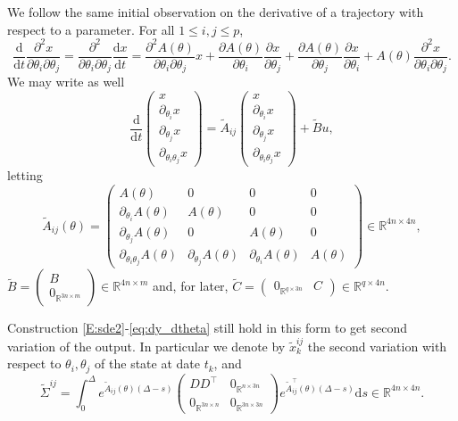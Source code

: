 \documentclass[twocolumn]{autart}
\theoremstyle{definition}
\theoremstyle{remark}
\newcommand{\R}{\mathbb{R}}
\newcommand{\diff}{\mathrm{d}}
\begin{document}
We follow the same initial observation on the derivative of a trajectory with respect to a parameter. For all $1\leq i,j\leq p$,
$$
\frac{\diff}{\diff t} \frac{\partial^2 x}{\partial \theta_i\partial \theta_j}
= 
\frac{\partial^2 }{\partial \theta_i\partial \theta_j} \frac{\diff x}{\diff t}
= 
\frac{\partial^2  A(\theta)}{\partial \theta_i\partial \theta_j}x +
\frac{\partial  A(\theta)}{\partial \theta_i}\frac{\partial  x}{\partial \theta_j} +
\frac{\partial  A(\theta)}{\partial \theta_j}\frac{\partial  x}{\partial \theta_i} +
A(\theta)   \frac{\partial^2 x}{\partial \theta_i\partial \theta_j}.
$$
We may write as well
$$
\frac{\diff}{\diff t}
\begin{pmatrix}
x
\\
\partial_{\theta_i} x
\\
\partial_{\theta_j} x
\\
\partial_{\theta_i\theta_j} x
\end{pmatrix}
=
\tilde A_{ij}
\begin{pmatrix}
x
\\
\partial_{\theta_i} x
\\
\partial_{\theta_j} x
\\
\partial_{\theta_i\theta_j} x
\end{pmatrix}
+
\tilde B u,
$$
letting 
$$
\tilde A_{ij}(\theta)=\begin{pmatrix}
    A(\theta) & 0 & 0 & 0
    \\
    \partial_{\theta_i}A(\theta) & A(\theta)& 0 & 0
    \\
    \partial_{\theta_j}A(\theta) & 0 & A(\theta) & 0
    \\
    \partial_{\theta_i\theta_j}A(\theta) &\partial_{\theta_j}A(\theta) & \partial_{\theta_i}A(\theta) & A(\theta)
\end{pmatrix}\in \R^{4n\times 4n},
$$
$\tilde B=\begin{pmatrix}
    B
    \\
    0_{\R^{3n\times m}}
    \end{pmatrix}\in \R^{4n\times m}$ and, for later, $\tilde C=\begin{pmatrix}
0_{\R^{q\times 3n}}&C
\end{pmatrix}\in \R^{q\times 4n}$.

Construction \eqref{E:sde2}-\eqref{eq:dy_dtheta} still hold in this form to get second variation of the output. In particular we denote by $\tilde x^{ij}_k$ the second variation with respect to $\theta_i,\theta_j$ of the state at date $t_k$, and 
$$
\tilde\Sigma^{ij} = \int_0^\Delta e^{\tilde A_{ij}(\theta)(\Delta-s)}
\begin{pmatrix}
D D^\top  & 0_{\R^{n\times 3n}}
\\
 0_{\R^{3n\times n}} & 0_{\R^{3n\times 3n}}
\end{pmatrix} 
e^{\tilde A_{ij}^\top(\theta)(\Delta-s)}\diff s\in \R^{4n\times 4n}.
$$
\end{document}
